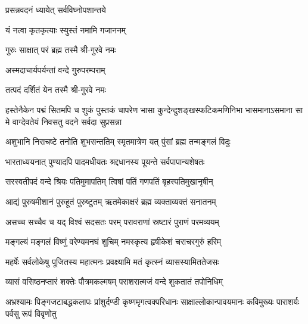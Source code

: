 
{प्रसन्नवदनं ध्यायेत् सर्वविघ्नोपशान्तये}

{यं नत्वा कृतकृत्याः स्युस्तं नमामि गजाननम्}


{गुरुः साक्षात् परं ब्रह्म तस्मै श्री-गुरवे नमः}

{अस्मदाचार्यपर्यन्तां वन्दे गुरुपरम्पराम्}

{तत्पदं दर्शितं येन तस्मै श्री-गुरवे नमः}

{हस्तेनैकेन पद्मं सितमपि च शुकं पुस्तकं चापरेण}
{भासा कुन्देन्दुशङ्खस्फटिकमणिनिभा भासमानाऽसमाना}
{सा मे वाग्देवतेयं निवसतु वदने सर्वदा सुप्रसन्ना}



\twolineshloka
{अशुभानि निराचष्टे तनोति शुभसन्ततिम्}
{स्मृतमात्रेण यत् पुंसां ब्रह्म तन्मङ्गलं विदुः}

\twolineshloka
{भारताध्ययनात् पुण्यादपि पादमधीयतः}
{श्रद्दधानस्य पूयन्ते सर्वपापान्यशेषतः}

\twolineshloka
{सरस्वतीपदं वन्दे श्रियः पतिमुमापतिम्}
{त्विषां पतिं गणपतिं बृहस्पतिमुखानृषीन्}

\twolineshloka
{आद्यं पुरुषमीशानं पुरुहूतं  पुरुष्टुतम्}
{ऋतमेकाक्षरं ब्रह्म व्यक्ताव्यक्तं सनातनम्}

\twolineshloka
{असच्च सच्चैव च यद् विश्वं सदसतः परम्}
{परावराणां स्रष्टारं पुराणं परमव्ययम्}

\twolineshloka
{मङ्गल्यं मङ्गलं विष्णुं वरेण्यमनघं शुचिम्}
{नमस्कृत्य हृषीकेशं चराचरगुरुं हरिम्}

\resetShloka


\twolineshloka
{महर्षेः सर्वलोकेषु पूजितस्य महात्मनः}
{प्रवक्ष्यामि मतं कृत्स्नं व्यासस्यामिततेजसः}

\twolineshloka
{व्यासं वसिष्ठनप्तारं शक्तेः पौत्रमकल्मषम्}
{पराशरात्मजं वन्दे शुकतातं तपोनिधिम्}

\fourlineindentedshloka
{अभ्रश्यामः पिङ्गजटाबद्धकलापः}
{प्रांशुर्दण्डी कृष्णमृगत्वक्परिधानः}
{साक्षाल्लोकान्पावयमानः कविमुख्यः}
{पाराशर्यः पर्वसु रूपं विवृणोतु}

